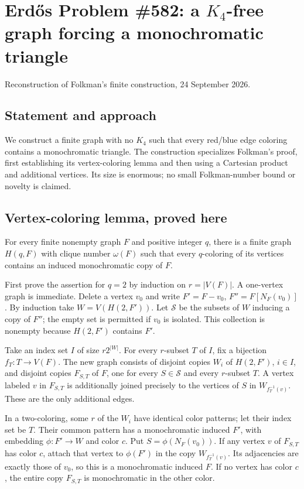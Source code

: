 \section{Erd\H{o}s Problem \#582: a $K_4$-free graph forcing a monochromatic triangle}
\noindent Reconstruction of Folkman's finite construction, 24 September 2026.

\subsection*{Statement and approach}
We construct a finite graph with no $K_4$ such that every red/blue edge coloring contains a monochromatic triangle. The construction specializes Folkman's proof, first establishing its vertex-coloring lemma and then using a Cartesian product and additional vertices. Its size is enormous; no small Folkman-number bound or novelty is claimed.

\subsection*{Vertex-coloring lemma, proved here}
For every finite nonempty graph $F$ and positive integer $q$, there is a finite graph $H(q,F)$ with clique number $\omega(F)$ such that every $q$-coloring of its vertices contains an induced monochromatic copy of $F$.

First prove the assertion for $q=2$ by induction on $r=|V(F)|$. A one-vertex graph is immediate. Delete a vertex $v_0$ and write $F'=F-v_0$, $F''=F[N_F(v_0)]$. By induction take $W=V(H(2,F'))$. Let $\mathcal S$ be the subsets of $W$ inducing a copy of $F''$; the empty set is permitted if $v_0$ is isolated. This collection is nonempty because $H(2,F')$ contains $F'$.

Take an index set $I$ of size $r2^{|W|}$. For every $r$-subset $T$ of $I$, fix a bijection $f_T:T\to V(F)$. The new graph consists of disjoint copies $W_i$ of $H(2,F')$, $i\in I$, and disjoint copies $F_{S,T}$ of $F$, one for every $S\in\mathcal S$ and every $r$-subset $T$. A vertex labeled $v$ in $F_{S,T}$ is additionally joined precisely to the vertices of $S$ in $W_{f_T^{-1}(v)}$. These are the only additional edges.

In a two-coloring, some $r$ of the $W_i$ have identical color patterns; let their index set be $T$. Their common pattern has a monochromatic induced $F'$, with embedding $\phi:F'\to W$ and color $c$. Put $S=\phi(N_F(v_0))$. If any vertex $v$ of $F_{S,T}$ has color $c$, attach that vertex to $\phi(F')$ in the copy $W_{f_T^{-1}(v)}$. Its adjacencies are exactly those of $v_0$, so this is a monochromatic induced $F$. If no vertex has color $c$, the entire copy $F_{S,T}$ is monochromatic in the other color.

